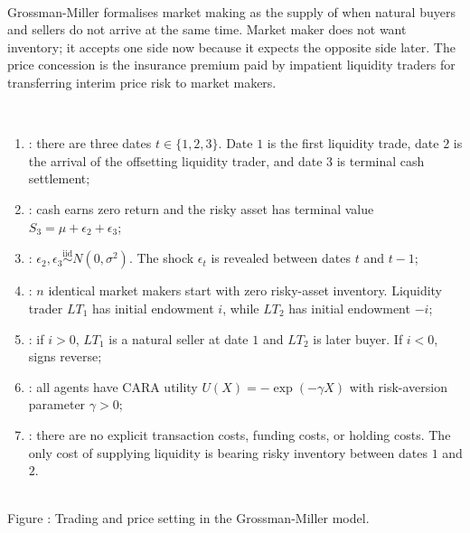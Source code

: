 \begin{model}  \cite{grossman_miller_1988}\\
Grossman-Miller formalises market making as the supply of  when natural buyers and sellers do not arrive at the same time. Market maker does not want inventory; it accepts one side now because it expects the opposite side later. The price concession is the insurance premium paid by impatient liquidity traders for transferring interim price risk to market makers.

\par\smallskip\noindent{}\\
\begin{enumerate}[label=\roman*.]
\setlength{\itemsep}{0pt}
\item {}: there are three dates $t\in\{1,2,3\}$. Date $1$ is the first liquidity trade, date $2$ is the arrival of the offsetting liquidity trader, and date $3$ is terminal cash settlement;
\item {}: cash earns zero return and the risky asset has terminal value $S_3=\mu+\epsilon_2+\epsilon_3$;
\item {}: $\epsilon_2,\epsilon_3\overset{\text{iid}}{\sim}N(0,\sigma^2)$. The shock $\epsilon_{t}$ is revealed between dates $t$ and $t-1$;
\item {}: $n$ identical market makers start with zero risky-asset inventory. Liquidity trader $LT_1$ has initial endowment $i$, while $LT_2$ has initial endowment $-i$;
\item {}: if $i>0$, $LT_1$ is a natural seller at date $1$ and $LT_2$ is later buyer. If $i<0$, signs reverse;
\item {}: all agents have CARA utility $U(X)=-\exp(-\gamma X)$ with risk-aversion parameter $\gamma>0$;
\item {}: there are no explicit transaction costs, funding costs, or holding costs. The only cost of supplying liquidity is bearing risky inventory between dates $1$ and $2$.
\end{enumerate}

\begin{center}
\label{fig:grossman_miller_trading}
\scalebox{0.82}{}\\
{\small Figure \thefigure: Trading and price setting in the Grossman-Miller model.}
\end{center}


\end{model}
